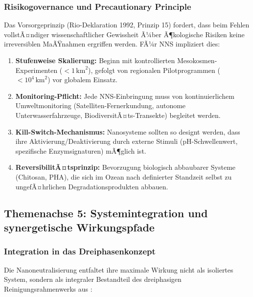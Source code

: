﻿\documentclass[12pt,a4paper]{article}
\theoremstyle{definition}
\theoremstyle{remark}
\begin{document}
\subsubsection{Risikogovernance und Precautionary Principle}

Das Vorsorgeprinzip (Rio-Deklaration 1992, Prinzip 15) fordert, dass beim
Fehlen vollstÃ¤ndiger wissenschaftlicher Gewissheit Ã¼ber Ã¶kologische Risiken
keine irreversiblen MaÃŸnahmen ergriffen werden. FÃ¼r NNS impliziert dies:

\begin{enumerate}[label=\textbf{G\arabic*.}]
  \item \textbf{Stufenweise Skalierung:} Beginn mit kontrollierten Mesokosmen-
        Experimenten ($< 1\,\text{km}^2$), gefolgt von regionalen
        Pilotprogrammen ($< 10^4\,\text{km}^2$) vor globalem Einsatz.
  \item \textbf{Monitoring-Pflicht:} Jede NNS-Einbringung muss von
        kontinuierlichem Umweltmonitoring (Satelliten-Fernerkundung,
        autonome Unterwasserfahrzeuge, BiodiversitÃ¤ts-Transekte) begleitet werden.
  \item \textbf{Kill-Switch-Mechanismus:} Nanosysteme sollten so designt werden,
        dass ihre Aktivierung/Deaktivierung durch externe Stimuli
        (pH-Schwellenwert, spezifische Enzymsignaturen) mÃ¶glich ist.
  \item \textbf{ReversibilitÃ¤tsprinzip:} Bevorzugung biologisch abbaubarer
        Systeme (Chitosan, PHA), die sich im Ozean nach definierter Standzeit
        selbst zu ungefÃ¤hrlichen Degradationsprodukten abbauen.
\end{enumerate}

\subsection{Themenachse 5: Systemintegration und synergetische Wirkungspfade}

\subsubsection{Integration in das Dreiphasenkonzept}

Die Nanoneutralisierung entfaltet ihre maximale Wirkung nicht als isoliertes System,
sondern als integraler Bestandteil des dreiphasigen Reinigungsrahmenwerks
aus \cite{cleanocn_epp2026}:
\end{document}
